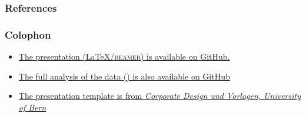 \documentclass[aspectratio=169, 10pt]{beamer}
\begin{document}
\begin{frame}
	\frametitle{References}
	\renewcommand*{\bibfont}{\scriptsize}
	\renewcommand{\bibopenparen}{\addcomma\addspace}
	\renewcommand{\bibcloseparen}{\addcomma\addspace}
	\printbibliography
\end{frame}

\begin{frame}
	\frametitle{Colophon}
	\begin{itemize}
			\item \href{https://github.com/habi/20190605_BrukerUserMeeting}{The presentation (\LaTeX/\textsc{beamer}) is available on GitHub.}
		\item \href{https://github.com/habi/Zebra-Fish-Gills/}{The full analysis of the data (\faPython) is also available on GitHub}
		\item \href{http://intern.unibe.ch/dienstleistungen/corporate_design_und_vorlagen/praesentationen/index_ger.html}{The presentation template is from \emph{Corporate Design und Vorlagen, University of Bern}}
	\end{itemize}
\end{frame}
\end{document}
